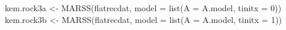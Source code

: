 \begin{Schunk}
\begin{Sinput}
 kem.rock3a <- MARSS(flatrecdat, model = list(A = A.model, tinitx = 0))
 kem.rock3b <- MARSS(flatrecdat, model = list(A = A.model, tinitx = 1))
\end{Sinput}
\end{Schunk}
